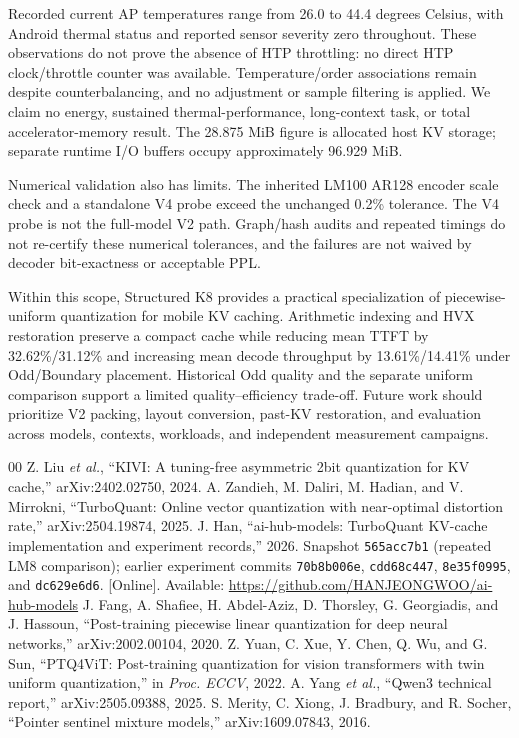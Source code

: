\documentclass[conference,a4paper,10pt]{IEEEtran}
\begin{document}
Recorded current AP temperatures range from 26.0 to 44.4 degrees Celsius, with Android thermal status and reported sensor severity zero throughout. These observations do not prove the absence of HTP throttling: no direct HTP clock/throttle counter was available. Temperature/order associations remain despite counterbalancing, and no adjustment or sample filtering is applied. We claim no energy, sustained thermal-performance, long-context task, or total accelerator-memory result. The 28.875 MiB figure is allocated host KV storage; separate runtime I/O buffers occupy approximately 96.929 MiB.

Numerical validation also has limits. The inherited LM100 AR128 encoder scale check and a standalone V4 probe exceed the unchanged 0.2\% tolerance. The V4 probe is not the full-model V2 path. Graph/hash audits and repeated timings do not re-certify these numerical tolerances, and the failures are not waived by decoder bit-exactness or acceptable PPL.

Within this scope, Structured K8 provides a practical specialization of piecewise-uniform quantization for mobile KV caching. Arithmetic indexing and HVX restoration preserve a compact cache while reducing mean TTFT by 32.62\%/31.12\% and increasing mean decode throughput by 13.61\%/14.41\% under Odd/Boundary placement. Historical Odd quality and the separate uniform comparison support a limited quality--efficiency trade-off. Future work should prioritize V2 packing, layout conversion, past-KV restoration, and evaluation across models, contexts, workloads, and independent measurement campaigns.

\begin{thebibliography}{00}
 Z. Liu \emph{et al.}, ``KIVI: A tuning-free asymmetric 2bit quantization for KV cache,'' arXiv:2402.02750, 2024.
 A. Zandieh, M. Daliri, M. Hadian, and V. Mirrokni, ``TurboQuant: Online vector quantization with near-optimal distortion rate,'' arXiv:2504.19874, 2025.
 J. Han, ``ai-hub-models: TurboQuant KV-cache implementation and experiment records,'' 2026. Snapshot \texttt{565acc7b1} (repeated LM8 comparison); earlier experiment commits \texttt{70b8b006e}, \texttt{cdd68c447}, \texttt{8e35f0995}, and \texttt{dc629e6d6}. [Online]. Available: \url{https://github.com/HANJEONGWOO/ai-hub-models}
 J. Fang, A. Shafiee, H. Abdel-Aziz, D. Thorsley, G. Georgiadis, and J. Hassoun, ``Post-training piecewise linear quantization for deep neural networks,'' arXiv:2002.00104, 2020.
 Z. Yuan, C. Xue, Y. Chen, Q. Wu, and G. Sun, ``PTQ4ViT: Post-training quantization for vision transformers with twin uniform quantization,'' in \emph{Proc. ECCV}, 2022.
 A. Yang \emph{et al.}, ``Qwen3 technical report,'' arXiv:2505.09388, 2025.
 S. Merity, C. Xiong, J. Bradbury, and R. Socher, ``Pointer sentinel mixture models,'' arXiv:1609.07843, 2016.
\end{thebibliography}
\end{document}
